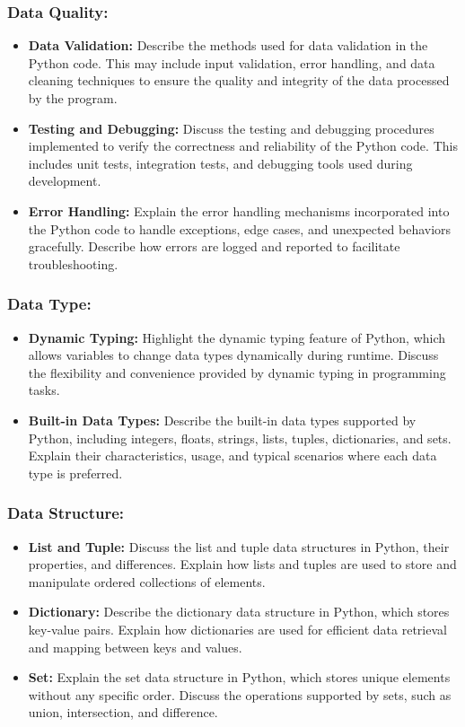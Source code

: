 \subsubsection*{Data Quality:}
\begin{itemize}[label=-]
	\item \textbf{Data Validation:} Describe the methods used for data validation in the Python code. This may include input validation, error handling, and data cleaning techniques to ensure the quality and integrity of the data processed by the program.
	\item \textbf{Testing and Debugging:} Discuss the testing and debugging procedures implemented to verify the correctness and reliability of the Python code. This includes unit tests, integration tests, and debugging tools used during development.
	\item \textbf{Error Handling:} Explain the error handling mechanisms incorporated into the Python code to handle exceptions, edge cases, and unexpected behaviors gracefully. Describe how errors are logged and reported to facilitate troubleshooting.
\end{itemize}

\subsubsection*{Data Type:}
\begin{itemize}[label=-]
	\item \textbf{Dynamic Typing:} Highlight the dynamic typing feature of Python, which allows variables to change data types dynamically during runtime. Discuss the flexibility and convenience provided by dynamic typing in programming tasks.
	\item \textbf{Built-in Data Types:} Describe the built-in data types supported by Python, including integers, floats, strings, lists, tuples, dictionaries, and sets. Explain their characteristics, usage, and typical scenarios where each data type is preferred.
\end{itemize}

\subsubsection*{Data Structure:}
\begin{itemize}[label=-]
	\item \textbf{List and Tuple:} Discuss the list and tuple data structures in Python, their properties, and differences. Explain how lists and tuples are used to store and manipulate ordered collections of elements.
	\item \textbf{Dictionary:} Describe the dictionary data structure in Python, which stores key-value pairs. Explain how dictionaries are used for efficient data retrieval and mapping between keys and values.
	\item \textbf{Set:} Explain the set data structure in Python, which stores unique elements without any specific order. Discuss the operations supported by sets, such as union, intersection, and difference.
\end{itemize}



